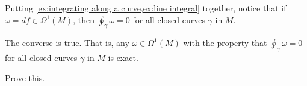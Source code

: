 Putting \cref{ex:integrating along a curve,ex:line integral} together, notice that if $\omega = df \in \Omega^1(M)$, then $\oint_\gamma \omega = 0$ for all closed curves $\gamma$ in $M$.

\begin{proposition}\label{prop:integrate to 0 => exact}
	The converse is true. That is, any $\omega \in \Omega^1(M)$ with the property that $\oint_\gamma \omega = 0$ for all closed curves $\gamma$ in $M$ is exact.
\end{proposition}

\begin{exercise}
	Prove this.
\end{exercise}